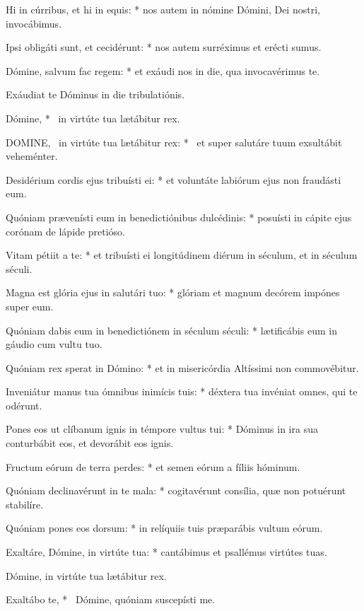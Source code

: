 Hi in cúrribus, et hi in equis: * nos autem in nómine Dómini, Dei nostri, invocábimus.

Ipsi obligáti sunt, et cecidérunt: * nos autem surréximus et erécti sumus.

Dómine, salvum fac regem: * et exáudi nos in die, qua invocavérimus te.

 Exáudiat te Dóminus in die tribulatiónis.

 Dómine, * \textdagger\ in virtúte tua lætábitur rex. \textdaggerdbl


\lettrine[lines=2]{D}{OMINE}, \textdagger\ in virtúte tua lætábitur rex: * \textdaggerdbl\ et super salutáre tuum exsultábit veheménter.

Desidérium cordis ejus tribuísti ei: * et voluntáte labiórum ejus non fraudásti eum.

Quóniam prævenísti eum in benedictiónibus dulcédinis: * posuísti in cápite ejus corónam de lápide pretióso.

Vitam pétiit a te: * et tribuísti ei longitúdinem diérum in séculum, et in séculum séculi.

Magna est glória ejus in salutári tuo: * glóriam et magnum decórem impónes super eum.

Quóniam dabis eum in benedictiónem in séculum séculi: * lætificábis eum in gáudio cum vultu tuo.

Quóniam rex sperat in Dómino: * et in misericórdia Altíssimi non commovébitur.

Inveniátur manus tua ómnibus inimícis tuis: * déxtera tua invéniat omnes, qui te odérunt.

Pones eos ut clíbanum ignis in témpore vultus tui: * Dóminus in ira sua conturbábit eos, et devorábit eos ignis.

Fructum eórum de terra perdes: * et semen eórum a fíliis hóminum.

Quóniam declinavérunt in te mala: * cogitavérunt consília, quæ non potuérunt stabilíre.

Quóniam pones eos dorsum: * in relíquiis tuis præparábis vultum eórum.

Exaltáre, Dómine, in virtúte tua: * cantábimus et psallémus virtútes tuas.

 Dómine, in virtúte tua lætábitur rex.

 Exaltábo te, * \textdagger\ Dómine, quóniam suscepísti me. \textdaggerdbl


